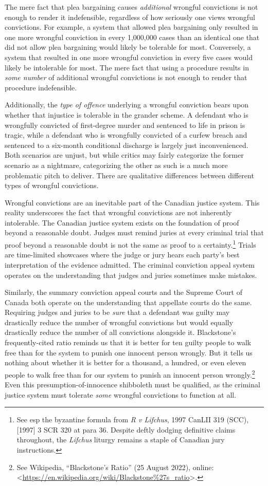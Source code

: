 The mere fact that plea bargaining causes \textit{additional} wrongful convictions is not enough to render it indefensible, regardless of how seriously one views wrongful convictions. For example, a system that allowed plea bargaining only resulted in one more wrongful conviction in every 1,000,000 cases than an identical one that did not allow plea bargaining would likely be tolerable for most. Conversely, a system that resulted in one more wrongful conviction in every five cases would likely be intolerable for most. The mere fact that using a procedure results in \textit{some number} of additional wrongful convictions is not enough to render that procedure indefensible. 

Additionally, the \textit{type of offence} underlying a wrongful conviction bears upon whether that injustice is tolerable in the grander scheme. A defendant who is wrongfully convicted of first-degree murder and sentenced to life in prison is tragic, while a defendant who is wrongfully convicted of a curfew breach and sentenced to a six-month conditional discharge is largely just inconvenienced. Both scenarios are unjust, but while critics may fairly categorize the former scenario as a nightmare, categorizing the other as such is a much more problematic pitch to deliver. There are qualitative differences between different types of wrongful convictions.

Wrongful convictions are an inevitable part of the Canadian justice system. This reality underscores the fact that wrongful convictions are not inherently intolerable. The Canadian justice system exists on the foundation of proof beyond a reasonable doubt. Judges must remind juries at every criminal trial that proof beyond a reasonable doubt is not the same as proof to a certainty.\footnote{See esp the byzantine formula from \textit{R v Lifchus}, 1997 CanLII 319 (SCC), [1997] 3 SCR 320 at para 36. Despite deftly dodging definitive claims throughout, the \textit{Lifchus} liturgy remains a staple of Canadian jury instructions.} Trials are time-limited showcases where the judge or jury hears each party's best interpretation of the evidence admitted. The criminal conviction appeal system operates on the understanding that judges and juries sometimes make mistakes.

Similarly, the summary conviction appeal courts and the Supreme Court of Canada both operate on the understanding that appellate courts do the same. Requiring judges and juries to be \textit{sure} that a defendant was guilty may drastically reduce the number of wrongful convictions but would equally drastically reduce the number of all convictions alongside it. Blackstone's frequently-cited ratio reminds us that it is better for ten guilty people to walk free than for the system to punish one innocent person wrongly. But it tells us nothing about whether it is better for a thousand, a hundred, or even eleven people to walk free than for our system to punish an innocent person wrongly.\footnote{See Wikipedia, “Blackstone's Ratio” (25 August 2022), online:\textless \url{https://en.wikipedia.org/wiki/Blackstone\%27s_ratio}\textgreater.} Even this presumption-of-innocence shibboleth must be qualified, as the criminal justice system must tolerate \textit{some} wrongful convictions to function at all. 

